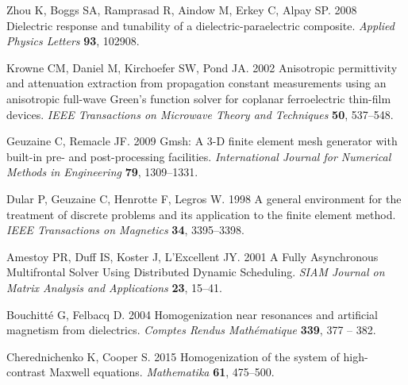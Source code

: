 \documentclass[%
 aip,
 amsmath,amssymb,
 reprint,%
]{revtex4-1}
\begin{document}
\begin{thebibliography}{99}
Zhou K, Boggs SA, Ramprasad R, Aindow M, Erkey C, Alpay SP. 2008  Dielectric
  response and tunability of a dielectric-paraelectric composite. {\em Applied
  Physics Letters} \textbf{93}, 102908.

Krowne CM, Daniel M, Kirchoefer SW, Pond JA. 2002  Anisotropic permittivity and
  attenuation extraction from propagation constant measurements using an
  anisotropic full-wave {Green}'s function solver for coplanar ferroelectric
  thin-film devices. {\em IEEE Transactions on Microwave Theory and Techniques}
  \textbf{50}, 537--548.

Geuzaine C, Remacle JF. 2009  Gmsh: {A} 3-{D} finite element mesh generator
  with built-in pre- and post-processing facilities. {\em International Journal
  for Numerical Methods in Engineering} \textbf{79}, 1309--1331.

Dular P, Geuzaine C, Henrotte F, Legros W. 1998  A general environment for the
  treatment of discrete problems and its application to the finite element
  method. {\em IEEE Transactions on Magnetics} \textbf{34}, 3395--3398.

Amestoy PR, Duff IS, Koster J, L'Excellent JY. 2001  A {Fully} {Asynchronous}
  {Multifrontal} {Solver} {Using} {Distributed} {Dynamic} {Scheduling}. {\em
  SIAM Journal on Matrix Analysis and Applications} \textbf{23}, 15--41.

Bouchitté G, Felbacq D. 2004  Homogenization near resonances and artificial
  magnetism from dielectrics. {\em Comptes Rendus Mathématique} \textbf{339},
  377 -- 382.

Cherednichenko K, Cooper S. 2015  Homogenization of the system of high-contrast
  {Maxwell} equations. {\em Mathematika} \textbf{61}, 475--500.

\end{thebibliography}


% 
% 
\end{document}
